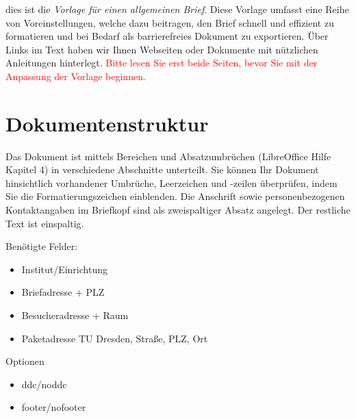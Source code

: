 \documentclass[twoside]{tudbrief2022}
\begin{document}
	\maketitle{}
	
	dies ist die \emph{Vorlage für einen allgemeinen Brief}.
	Diese Vorlage umfasst eine Reihe von Voreinstellungen, welche dazu beitragen, den Brief schnell und effizient zu formatieren und bei Bedarf als barrierefreies Dokument zu exportieren.
	Über Links im Text haben wir Ihnen Webseiten oder Dokumente mit nützlichen Anleitungen hinterlegt.
	\textcolor{red}{Bitte lesen Sie erst beide Seiten, bevor Sie mit der Anpassung der Vorlage beginnen.}
	
	\section*{Dokumentenstruktur}
	Das Dokument ist mittels Bereichen und Absatzumbrüchen (LibreOffice Hilfe Kapitel 4) in verschiedene Abschnitte unterteilt. Sie können Ihr Dokument hinsichtlich vorhandener Umbrüche, Leerzeichen und -zeilen überprüfen, indem Sie die Formatierungszeichen einblenden. Die Anschrift sowie personenbezogenen Kontaktangaben im Briefkopf sind als zweispaltiger Absatz angelegt. Der restliche Text ist einspaltig.
	
	Benötigte Felder:
	\begin{itemize}
		\item Institut/Einrichtung
		\item Briefadresse + PLZ
		\item Besucheradresse + Raum
		\item Paketadresse TU Dresden, Straße, PLZ, Ort
	\end{itemize}
	Optionen
	\begin{itemize}
		\item ddc/noddc
		\item footer/nofooter
	\end{itemize}
	
	
\end{document}
